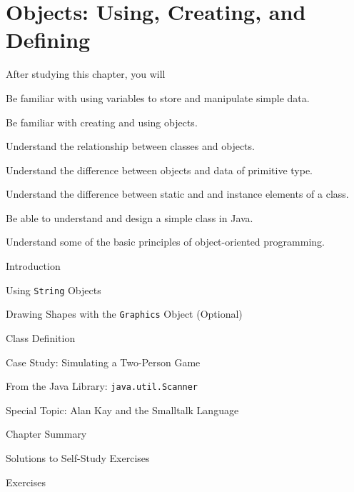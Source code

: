 
\setcounter{SSTUDYcount}{1}
\setcounter{chapter}{1}
\chapter{Objects: Using, Creating, and Defining}
\label{chapter-objects}
\label{pg-chapter-objects}

\CObegin
{}
\noindent After studying this chapter, you will
\begin{COBL}
\item Be familiar with using variables to store and manipulate simple data.
\item Be familiar with creating and using objects.
\item Understand the relationship between classes and objects.
\item Understand the difference between objects and data of primitive type.
\item Understand the difference between static and and instance 
elements of a class.
\item Be able to understand and design a simple class in Java.
\item Understand some of the basic principles of object-oriented programming.

\end{COBL}

\begin{COL}
\item Introduction
\item Using {\tt String} Objects
\item Drawing Shapes with the {\tt Graphics} Object (Optional)
\item Class Definition
\item Case Study: Simulating a Two-Person Game
\item {From the Java Library: {\tt java.util.Scanner}}
\item[]{{\color{cyan}Special Topic:} Alan Kay and the Smalltalk Language}
\par\small\item[] Chapter Summary
\par\small\item[] Solutions to Self-Study Exercises
\par\small\item[] Exercises
\end{COL}
\COend

